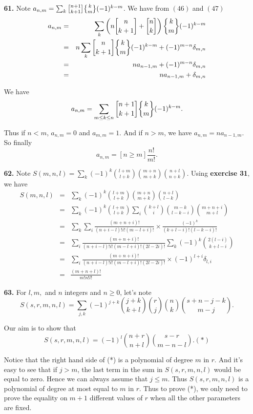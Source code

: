\documentclass[a4paper,12pt]{article}
\newcommand{\newpar}[1]{\bigskip \noindent \textbf{#1.}}
\newcommand{\stirlingone}[2]{{#1 \atopwithdelims[]#2}}
\newcommand{\stirlingtwo}[2]{{#1 \atopwithdelims\{\}#2}}
\begin{document}
\newpar{61} Note $a_{n,m} = \sum_k
\stirlingone{n+1}{k+1}\stirlingtwo{k}{m}(-1)^{k-m}$.  We have from
$(46)$ and $(47)$
\begin{eqnarray*}
  a_{n,m} &=&
  \sum_k \left( n \stirlingone{n}{k+1} + \stirlingone{n}{k}\right)
  \stirlingtwo{k}{m} (-1)^{k-m} \\
  &=& n \sum_k \stirlingone{n}{k+1} \stirlingtwo{k}{m} (-1)^{k-m} +
  (-1)^{m-n} \delta_{m,n} \\
  &=& n a_{n-1,m} + (-1)^{m-n}\delta_{m,n} \\
  &=& n a_{n-1,m} + \delta_{m,n}
\end{eqnarray*}

We have
\[ a_{n,m} = \sum_{m \le k \le n} \stirlingone{n+1}{k+1}
\stirlingtwo{k}{m}(-1)^{k-m}.\]

Thus if $n<m$, $a_{n,m} = 0$ and $a_{m,m} = 1$.  And if $n > m$, we
have $a_{n,m} = n a_{n-1,m}$.  So finally
\[ a_{n,m} = [ n \ge m ] \frac{n!}{m!}.\]

\newpar{62} Note $S(m,n,l) = \sum_k(-1)^k {l+m \choose l+k}{m+n
  \choose m+k}{n+l \choose n+k}$.  Using \textbf{exercise 31}, we have
\begin{eqnarray*}
 S(m,n,l) &=& \sum_k(-1)^k {l+m \choose l+k}{m+n \choose m+k}{n+l
   \choose l-k} \\
  &=& \sum_k (-1)^k {l+m \choose l+k} \sum_i {k+l \choose i} {m-k
   \choose l-k-i}{m+n+i \choose m+l} \\
 &=& \sum_k \sum_i \frac{(m+n+i)!}{(n+i-l)! i! (m-l+i)!} \times
 \frac{(-1)^k}{(k+l-i)!(l-k-i)!} \\
 &=& \sum_i \frac{(m+n+i)!}{(n+i-l)!i!(m-l+i)!(2l-2i)!} \sum_k (-1)^k
      {2(l-i) \choose k+l-i} \\
  &=& \sum_i \frac{(m+n+i)!}{(n+i-l)!i!(m-l+i)!(2l-2i)!} \times
      (-1)^{l+i} \delta_{l,i} \\
      &=& \frac{(m+n+l)!}{m!n!l!}
\end{eqnarray*}

\newpar{63} For $l, m,$ and $n$ integers and $n \ge 0$, let's note
\[ S(s, r, m, n, l) = \sum_{j,k}(-1)^{j+k}{j+k \choose k+l}{r \choose
  j}{n \choose k}{s + n - j -k \choose m-j}.\]

Our aim is to show that
\[ S(s, r, m, n, l) = (-1)^l {n+r \choose n+l} {s-r \choose
  m-n-l}.(*)\]

Notice that the right hand side of (*) is a polynomial of degree $m$ in
$r$.  And it's easy to see that if $j > m$, the last term in the sum
in $S(s, r, m, n, l)$ would be equal to zero.  Hence we can always
assume that $j \le m$.  Thus $S(s, r, m, n, l)$ is a polynomial of
degree at most equal to $m$ in $r$.  Thus to prove (*), we only need
to prove the equality on $m+1$ different values of $r$ when all the
other parameters are fixed.
\end{document}
